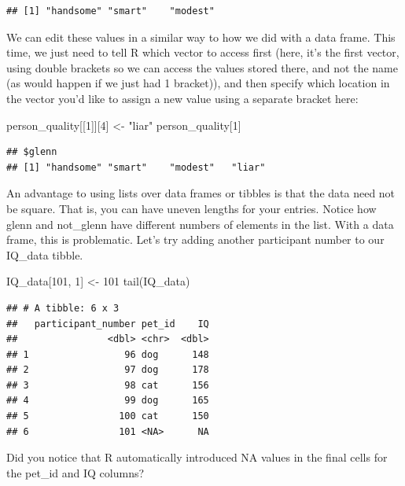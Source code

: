 \documentclass[
]{book}
\newenvironment{Shaded}{\begin{snugshade}}{\end{snugshade}}
\newcommand{\DecValTok}[1]{\textcolor[rgb]{0.00,0.00,0.81}{#1}}
\newcommand{\FunctionTok}[1]{\textcolor[rgb]{0.00,0.00,0.00}{#1}}
\newcommand{\NormalTok}[1]{#1}
\newcommand{\OtherTok}[1]{\textcolor[rgb]{0.56,0.35,0.01}{#1}}
\newcommand{\StringTok}[1]{\textcolor[rgb]{0.31,0.60,0.02}{#1}}
\begin{document}
\begin{verbatim}
## [1] "handsome" "smart"    "modest"
\end{verbatim}

We can edit these values in a similar way to how we did with a data frame. This time, we just need to tell R which vector to access first (here, it's the first vector, using double brackets so we can access the values stored there, and not the name (as would happen if we just had 1 bracket)), and then specify which location in the vector you'd like to assign a new value using a separate bracket here:

\begin{Shaded}
\begin{Highlighting}[]
\NormalTok{person\_quality[[}\DecValTok{1}\NormalTok{]][}\DecValTok{4}\NormalTok{] }\OtherTok{\textless{}{-}} \StringTok{"liar"}
\NormalTok{person\_quality[}\DecValTok{1}\NormalTok{]}
\end{Highlighting}
\end{Shaded}

\begin{verbatim}
## $glenn
## [1] "handsome" "smart"    "modest"   "liar"
\end{verbatim}

An advantage to using lists over data frames or tibbles is that the data need not be square. That is, you can have uneven lengths for your entries. Notice how glenn and not\_glenn have different numbers of elements in the list. With a data frame, this is problematic. Let's try adding another participant number to our IQ\_data tibble.

\begin{Shaded}
\begin{Highlighting}[]
\NormalTok{IQ\_data[}\DecValTok{101}\NormalTok{, }\DecValTok{1}\NormalTok{] }\OtherTok{\textless{}{-}} \DecValTok{101}
\FunctionTok{tail}\NormalTok{(IQ\_data)}
\end{Highlighting}
\end{Shaded}

\begin{verbatim}
## # A tibble: 6 x 3
##   participant_number pet_id    IQ
##                <dbl> <chr>  <dbl>
## 1                 96 dog      148
## 2                 97 dog      178
## 3                 98 cat      156
## 4                 99 dog      165
## 5                100 cat      150
## 6                101 <NA>      NA
\end{verbatim}

Did you notice that R automatically introduced NA values in the final cells for the pet\_id and IQ columns?
\end{document}
